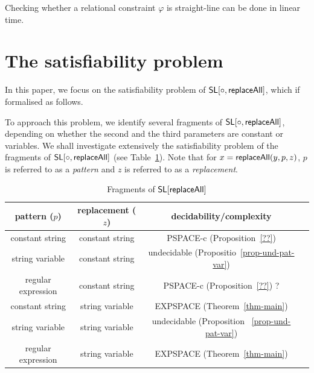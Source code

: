 \begin{remark}
Checking whether a relational constraint $\varphi$ is straight-line can be done in linear time. 
\end{remark}

\begin{example}
\end{example}




\section{The satisfiability problem} \label{sec-sat}
In this paper, we focus on the satisfiability problem of $\mathsf{SL}[\circ,\mathsf{replaceAll}]$, which if formalised as follows. 

\smallskip

\begin{quote}
\end{quote}
\smallskip

To approach this problem, we identify several fragments of  $\mathsf{SL}[\circ,\mathsf{replaceAll}]$, depending on whether the second and the third parameters are constant or variables.  We shall investigate extensively the satisfiability problem of the fragments of $\mathsf{SL}[\circ, \mathsf{replaceAll}]$ (see Table~\ref{tab-sum}).  Note that for $x=\mathsf{replaceAll} (y, p, z)$, $p$ is referred to as a \emph{pattern} and $z$ is referred to as a \emph{replacement}.



\begin{table}[htbp]
\begin{tabular}{|c|c|c|c}
\hline
pattern ($p$)  &   replacement ($z$)        & decidability/complexity \\
\hline
constant string  &   constant   string                    & PSPACE-c (Proposition~\ref{??})    \\
\hline
string variable &   constant   string                    &  undecidable (Propositio~\ref{prop-und-pat-var})    \\
\hline
regular expression  &   constant string                      &    PSPACE-c (Proposition~\ref{??}) ?     \\

\hline
constant string  &   string variable                       & EXPSPACE (Theorem~\ref{thm-main})       \\

\hline
string variable  &   string variable                       & undecidable   (Proposition ~\ref{prop-und-pat-var})   \\

\hline
regular expression  &   string variable                       &      EXPSPACE (Theorem~\ref{thm-main})      \\
\hline
\end{tabular}
\caption{Fragments of $\mathsf{SL}[\mathsf{replaceAll}]$}\label{tab-sum}
\end{table}

